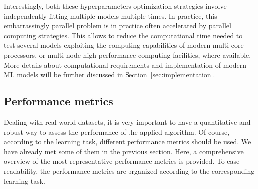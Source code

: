   Interestingly, both these hyperparameters optimization strategies involve independently fitting multiple models multiple times. In practice, this embarrassingly parallel problem is in practice often accelerated by parallel computing strategies. This allows to reduce the computational time needed to test several models exploiting the computing capabilities of modern multi-core processors, or multi-node high performance computing facilities, where available. More details about computational requirements and implementation of modern ML models will be further discussed in Section~\ref{sec:implementation}.


    \subsection{Performance metrics} \label{sec:performance_metrics}
    Dealing with real-world datasets, it is very important to have a quantitative and robust way to assess the performance of the applied algorithm. Of course, according to the learning task, different performance metrics should be used. We have already met some of them in the previous section. Here, a comprehensive overview of the most representative performance metrics is provided. To ease readability, the performance metrics are organized according to the corresponding learning task.
    
